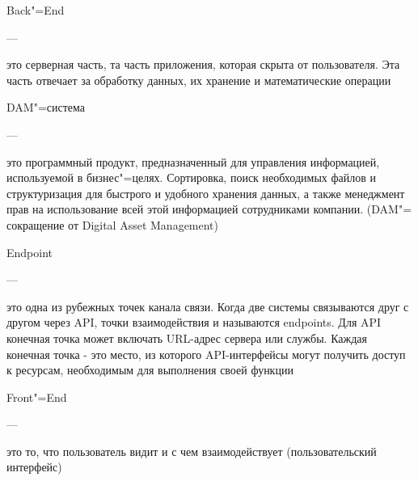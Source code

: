 \RaggedRight \noindent \justify \sloppy Back"=End
\begin{minipage}[t][][t]{1.9cm}
\RaggedLeft
  ---
\end{minipage}
\begin{minipage}[t][][t]{0.75\textwidth}
\RaggedRight  \justify \sloppy
 это серверная часть, та часть приложения, которая скрыта от пользователя. Эта часть отвечает за обработку данных, их хранение и математические операции \\
\end{minipage}


\RaggedRight \noindent \justify \sloppy DAM"=система
\begin{minipage}[t][][t]{1cm}
\RaggedLeft
  ---
\end{minipage}%
\begin{minipage}[t][][t]{0.75\textwidth}
\RaggedRight  \justify \sloppy
 это программный продукт, предназначенный для управления информацией, используемой в бизнес"=целях. Сортировка, поиск необходимых файлов и структуризация для быстрого и удобного хранения данных, а также менеджмент прав на использование всей этой информацией сотрудниками компании. (DAM"= сокращение от Digital Asset Management) \\
\end{minipage}



\RaggedRight \noindent \justify \sloppy Endpoint
\begin{minipage}[t][][t]{1.9cm}
\RaggedLeft
  ---
\end{minipage}
\begin{minipage}[t][][t]{0.75\textwidth}
\RaggedRight  \justify \sloppy
это одна из рубежных точек канала связи. Когда две системы связываются друг с другом через API, точки взаимодействия и называются endpoints. Для API конечная точка может включать URL-адрес сервера или службы. Каждая конечная точка - это место, из которого API-интерфейсы могут получить доступ к ресурсам, необходимым для выполнения своей функции \\
\end{minipage}



\RaggedRight \noindent \justify \sloppy Front"=End
\begin{minipage}[t][][t]{1.7cm}
\RaggedLeft
  ---
\end{minipage}
\begin{minipage}[t][][t]{0.75\textwidth}
\RaggedRight  \justify \sloppy
это то, что пользователь видит и с чем взаимодействует (пользовательский интерфейс) \\
\end{minipage}



